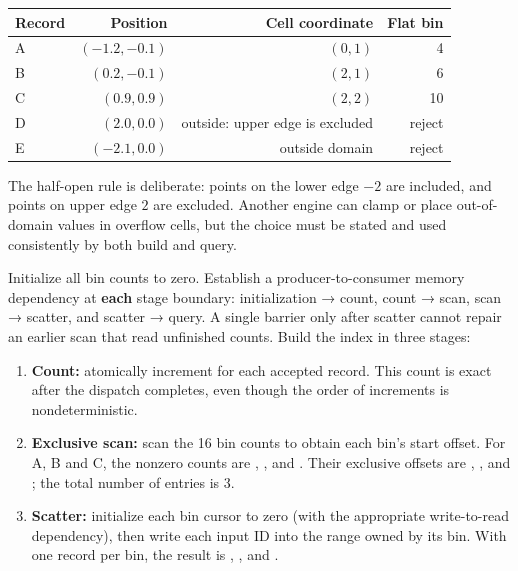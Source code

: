{\def\LTcaptype{none} %
\begin{longtable}[]{@{}lrrr@{}}
\toprule\noalign{}
Record & Position & Cell coordinate & Flat bin \\
\midrule\noalign{}
\endhead
\bottomrule\noalign{}
\endlastfoot
A & \((-1.2,-0.1)\) & \((0,1)\) & 4 \\
B & \((0.2,-0.1)\) & \((2,1)\) & 6 \\
C & \((0.9,0.9)\) & \((2,2)\) & 10 \\
D & \((2.0,0.0)\) & outside: upper edge is excluded & reject \\
E & \((-2.1,0.0)\) & outside domain & reject \\
\end{longtable}
}

The half-open rule is deliberate: points on the lower edge \(-2\) are included, and points on upper edge \(2\) are excluded. Another engine can clamp or place out-of-domain values in overflow cells, but the choice must be stated and used consistently by both build and query.

Initialize all bin counts to zero. Establish a producer-to-consumer memory dependency at \textbf{each} stage boundary: initialization → count, count → scan, scan → scatter, and scatter → query. A single barrier only after scatter cannot repair an earlier scan that read unfinished counts. Build the index in three stages:

\begin{enumerate}
\def\labelenumi{\arabic{enumi}.}
\tightlist
\item
  \textbf{Count:} atomically increment  for each accepted record. This count is exact after the dispatch completes, even though the order of increments is nondeterministic.
\item
  \textbf{Exclusive scan:} scan the 16 bin counts to obtain each bin's start offset. For A, B and C, the nonzero counts are , , and . Their exclusive offsets are , , and ; the total number of entries is 3.
\item
  \textbf{Scatter:} initialize each bin cursor to zero (with the appropriate write-to-read dependency), then write each input ID into the range owned by its bin. With one record per bin, the result is , , and .
\end{enumerate}

